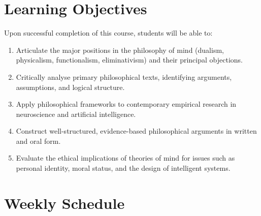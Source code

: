 \documentclass[11pt, a4paper]{article}
\begin{document}
\section{Learning Objectives}

Upon successful completion of this course, students will be able to:

\begin{enumerate}[leftmargin=*, label=\textbf{\arabic*.}, itemsep=2pt]
  \item Articulate the major positions in the philosophy of mind (dualism, physicalism,
        functionalism, eliminativism) and their principal objections.
  \item Critically analyse primary philosophical texts, identifying arguments, assumptions,
        and logical structure.
  \item Apply philosophical frameworks to contemporary empirical research in neuroscience
        and artificial intelligence.
  \item Construct well-structured, evidence-based philosophical arguments in written and
        oral form.
  \item Evaluate the ethical implications of theories of mind for issues such as
        personal identity, moral status, and the design of intelligent systems.
\end{enumerate}

\section{Weekly Schedule}
\end{document}
